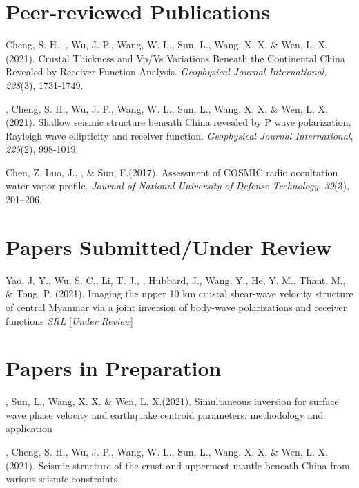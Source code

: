 \newcommand{\Revision}{\textit{under revision}}
\newcommand{\CS}{*} %
\newcommand{\CF}{\textsuperscript{\#}} %


\section*{Peer-reviewed Publications}

\begin{etaremune}
\item
    Cheng, S. H., \Xiao, Wu, J. P., Wang, W. L., Sun, L., Wang, X. X. \& Wen, L. X.(2021).
    Crustal Thickness and Vp/Vs Variations Beneath the Continental China Revealed by Receiver Function Analysis.
    \textit{Geophysical Journal International}, \textit{228}(3), 1731-1749.
\item
    \Xiao, Cheng, S. H., Wu, J. P., Wang, W. L., Sun, L., Wang, X. X. \& Wen, L. X.(2021).
    Shallow seismic structure beneath China revealed by P wave polarization, Rayleigh wave ellipticity and receiver function.
    \textit{Geophysical Journal International}, \textit{225}(2), 998-1019.
\item
    Chen, Z. Luo, J.,  \Xiao, \& Sun, F.(2017).
    Assessment of COSMIC radio occultation water vapor profile.
    \textit{Journal of National University of Defense Technology}, \textit{39}(3), 201--206.
\end{etaremune}

\section*{Papers Submitted/Under Review}
\begin{etaremune}
\item
    Yao, J. Y., Wu, S. C., Li, T. J., \Xiao, Hubbard, J., Wang, Y., He, Y. M., Thant, M., \& Tong, P. (2021).
    Imaging the upper 10 km crustal shear-wave velocity structure of central Myanmar via a joint inversion of body-wave polarizations and receiver functions
    \textit{SRL} [\textit{Under Review}]
\end{etaremune}

\section*{Papers in Preparation}
\begin{etaremune}
\item
    \Xiao, Sun, L., Wang, X. X. \& Wen, L. X.(2021).
    Simultaneous inversion for surface wave phase velocity and earthquake centroid parameters: methodology and application
\item
    \Xiao, Cheng, S. H., Wu, J. P., Wang, W. L., Sun, L., Wang, X. X. \& Wen, L. X.(2021).
    Seismic structure of the crust and uppermost mantle beneath China from various seismic constraints.
\end{etaremune}

